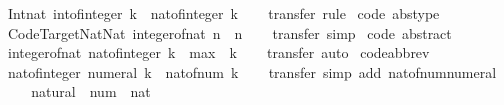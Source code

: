 \begin{isabellebody}
\ \ {\isachardoublequoteopen}Int{\isachardot}nat\ {\isacharparenleft}int{\isacharunderscore}of{\isacharunderscore}integer\ k{\isacharparenright}\ {\isacharequal}\ nat{\isacharunderscore}of{\isacharunderscore}integer\ k{\isachardoublequoteclose}\isanewline
%
\isadelimproof
\ \ %
\endisadelimproof
%
\isatagproof
{}\isamarkupfalse%
\ transfer\ rule%
\endisatagproof
{\isafoldproof}%
%
\isadelimproof
\isanewline
%
\endisadelimproof
\isanewline
{}\isamarkupfalse%
\ {\isacharbrackleft}code\ abstype{\isacharbrackright}{\isacharcolon}\isanewline
\ \ {\isachardoublequoteopen}Code{\isacharunderscore}Target{\isacharunderscore}Nat{\isachardot}Nat\ {\isacharparenleft}integer{\isacharunderscore}of{\isacharunderscore}nat\ n{\isacharparenright}\ {\isacharequal}\ n{\isachardoublequoteclose}\isanewline
%
\isadelimproof
\ \ %
\endisadelimproof
%
\isatagproof
{}\isamarkupfalse%
\ transfer\ simp%
\endisatagproof
{\isafoldproof}%
%
\isadelimproof
\isanewline
%
\endisadelimproof
\isanewline
{}\isamarkupfalse%
\ {\isacharbrackleft}code\ abstract{\isacharbrackright}{\isacharcolon}\isanewline
\ \ {\isachardoublequoteopen}integer{\isacharunderscore}of{\isacharunderscore}nat\ {\isacharparenleft}nat{\isacharunderscore}of{\isacharunderscore}integer\ k{\isacharparenright}\ {\isacharequal}\ max\ {}\ k{\isachardoublequoteclose}\isanewline
%
\isadelimproof
\ \ %
\endisadelimproof
%
\isatagproof
{}\isamarkupfalse%
\ transfer\ auto%
\endisatagproof
{\isafoldproof}%
%
\isadelimproof
\isanewline
%
\endisadelimproof
\isanewline
{}\isamarkupfalse%
\ {\isacharbrackleft}code{\isacharunderscore}abbrev{\isacharbrackright}{\isacharcolon}\isanewline
\ \ {\isachardoublequoteopen}nat{\isacharunderscore}of{\isacharunderscore}integer\ {\isacharparenleft}numeral\ k{\isacharparenright}\ {\isacharequal}\ nat{\isacharunderscore}of{\isacharunderscore}num\ k{\isachardoublequoteclose}\isanewline
%
\isadelimproof
\ \ %
\endisadelimproof
%
\isatagproof
{}\isamarkupfalse%
\ transfer\ {\isacharparenleft}simp\ add{\isacharcolon}\ nat{\isacharunderscore}of{\isacharunderscore}num{\isacharunderscore}numeral{\isacharparenright}%
\endisatagproof
{\isafoldproof}%
%
\isadelimproof
\isanewline
%
\endisadelimproof
\isanewline
{}\isamarkupfalse%
\isanewline
{}\ \ \isanewline
\isanewline
{}\ \isamarkupfalse%
\ natural\ {\isacharcolon}{\isacharcolon}\ {\isachardoublequoteopen}num\ {\isasymRightarrow}\ nat{\isachardoublequoteclose}\isanewline

\end{isabellebody}
